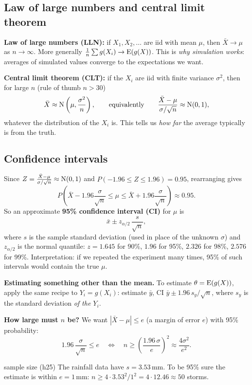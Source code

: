 \subsection{Law of large numbers and central limit theorem}
\textbf{Law of large numbers (LLN):} if $X_1, X_2,\dots$ are iid with mean $\mu$, then $\bar X \to \mu$ as $n\to\infty$. More generally $\frac1n\sum g(X_i) \to \mathrm{E}(g(X))$. This is \emph{why simulation works}: averages of simulated values converge to the expectations we want.

\textbf{Central limit theorem (CLT):} if the $X_i$ are iid with finite variance $\sigma^2$, then for large $n$ (rule of thumb $n > 30$)
\[
\bar X \approx \mathrm{N}\left(\mu, \frac{\sigma^2}{n}\right), \qquad\text{equivalently}\qquad \frac{\bar X - \mu}{\sigma/\sqrt n} \approx \mathrm{N}(0,1),
\]
whatever the distribution of the $X_i$ is. This tells us \emph{how far} the average typically is from the truth.

\subsection{Confidence intervals}
Since $Z = \frac{\bar X - \mu}{\sigma/\sqrt n}\approx \mathrm{N}(0,1)$ and $P(-1.96 \le Z \le 1.96) = 0.95$, rearranging gives
\[
P\left(\bar X - 1.96\frac{\sigma}{\sqrt n} \le \mu \le \bar X + 1.96\frac{\sigma}{\sqrt n}\right) \approx 0.95 .
\]
So an approximate \textbf{95\% confidence interval (CI)} for $\mu$ is
\[
\bar x \pm z_{\alpha/2}\,\frac{s}{\sqrt n},
\]
where $s$ is the sample standard deviation (used in place of the unknown $\sigma$) and $z_{\alpha/2}$ is the normal quantile: $z = 1.645$ for 90\%, $1.96$ for 95\%, $2.326$ for 98\%, $2.576$ for 99\%. Interpretation: if we repeated the experiment many times, 95\% of such intervals would contain the true $\mu$.

\textbf{Estimating something other than the mean.} To estimate $\theta = \mathrm{E}(g(X))$, apply the same recipe to $Y_i = g(X_i)$: estimate $\bar y$, CI $\bar y \pm 1.96\, s_y/\sqrt n$, where $s_y$ is the standard deviation \emph{of the $Y_i$}.

\textbf{How large must $n$ be?} We want $|\bar X - \mu| \le e$ (a margin of error $e$) with 95\% probability:
\[
1.96\,\frac{\sigma}{\sqrt n} \le e \quad\Longleftrightarrow\quad n \ge \left(\frac{1.96\,\sigma}{e}\right)^2 \approx \frac{4\sigma^2}{e^2}.
\]

\begin{example}{sample size (h25)}
The rainfall data have $s = 3.53$\,mm. To be 95\% sure the estimate is within $e=1$\,mm: $n \ge 4\cdot 3.53^2/1^2 = 4\cdot 12.46 \approx 50$ storms.
\end{example}

